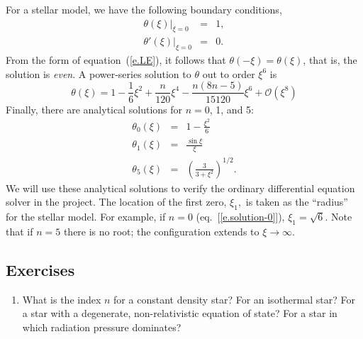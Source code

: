 For a stellar model, we have the following boundary conditions,
\begin{eqnarray}
\label{e.thetabc}\left.\theta(\xi)\right|_{\xi = 0} &=& 1,\\
\label{e.thetapbc}\left.\theta'(\xi)\right|_{\xi=0} &=& 0.
\end{eqnarray}
From the form of equation~(\ref{e.LE}), it follows that $\theta(-\xi) = \theta(\xi)$, that is, the solution is \emph{even}. A power-series solution to $\theta$ out to order $\xi^{6}$ is
\begin{equation}\label{e.series}
\theta(\xi) = 1 - \frac{1}{6}\xi^{2} + \frac{n}{120}\xi^{4} - \frac{n(8n-5)}{15120}\xi^{6} + \mathcal{O}(\xi^{8})
\end{equation}
Finally, there are analytical solutions for $n = 0$, 1, and 5:
\begin{eqnarray}
\theta_{0}(\xi) &=& 1-\frac{\xi^{2}}{6}\label{e.solution-0}\\
\theta_{1}(\xi) &=& \frac{\sin\xi}{\xi}\label{e.solution-1}\\
\theta_{5}(\xi) &=& \left(\frac{3}{3 + \xi^{2}}\right)^{1/2}.\label{e.solution-5}
\end{eqnarray}
We will use these analytical solutions to verify the ordinary differential equation solver in the project.  The location of the first zero, $\xi_{1},$ is taken as the ``radius'' for the stellar model.  For example, if $n = 0$ (eq.~[\ref{e.solution-0}]), $\xi_{1} = \sqrt{6}$. Note that if $n=5$ there is no root; the configuration extends to $\xi \to \infty$.

\subsection{Exercises}
\begin{enumerate}
\item What is the index $n$ for a constant density star? For an isothermal star? For a star with a degenerate, non-relativistic equation of state? For a star in which radiation pressure dominates?
\end{enumerate}
